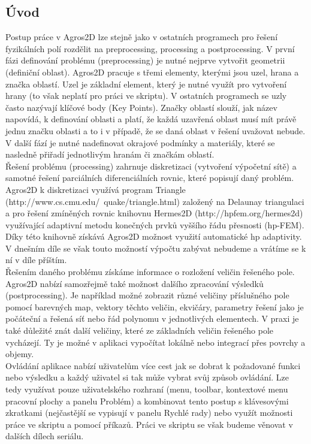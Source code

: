 \documentclass[a4paper, oneside]{article}
\begin{document}
\subsection{Úvod}
Postup práce v Agros2D lze stejně jako v ostatních programech pro řešení fyzikálních polí rozdělit na preprocessing, processing a postprocessing. V první fázi definování problému (preprocessing) je nutné nejprve vytvořit geometrii (definiční oblast). Agros2D pracuje s třemi elementy, kterými jsou uzel, hrana a značka oblastí. Uzel je základní element, který je nutné využít pro vytvoření hrany (to však neplatí pro práci ve skriptu). V ostatních programech se uzly často nazývají klíčové body (Key Points). Značky oblastí slouží, jak název napovídá, k definování oblasti a platí, že každá uzavřená oblast musí mít právě jednu značku oblasti a to i v případě, že se daná oblast v řešení uvažovat nebude. V další fází je nutné nadefinovat okrajové podmínky a materiály, které se nasledně přiřadí jednotlivým hranám či značkám oblastí.\\
Řešení problému (processing) zahrnuje diskretizaci (vytvoření výpočetní sítě) a samotné řešení parciálních diferenciálních rovnic, které popisují daný problém. Agros2D k diskretizaci využívá program Triangle (http://www.cs.cmu.edu/~quake/triangle.html) založený na Delaunay triangulaci a pro řešení zmíněných rovnic knihovnu Hermes2D (http://hpfem.org/hermes2d) využívající adaptivní metodu konečných prvků vyššího řádu přesnosti (hp-FEM). Díky této knihovně získává Agros2D možnost využití automatické hp adaptivity. V dnešním díle se však touto možností výpočtu zabývat nebudeme a vrátíme se k ní v díle příštím.\\
Řešením daného problému získáme informace o rozložení veličin řešeného pole. Agros2D nabízí samozřejmě také možnost dalšího zpracování výsledků (postprocessing). Je například možné zobrazit různé veličiny příslušného pole pomocí barevných map, vektory těchto veličin, ekvičáry, parametry řešení jako je počáteční a řešená síť nebo řád polynomu v jednotlivých elementech. V praxi je také důležité znát další veličiny, které ze základních veličin řešeného pole vycházejí. Ty je možné v aplikaci vypočítat lokálně nebo integrací přes povrchy a objemy.\\
Ovládání aplikace nabízí uživatelům více cest jak se dobrat k požadované funkci nebo výsledku a každý uživatel si tak může vybrat svůj způsob ovládání. Lze tedy využívat pouze uživatelského rozhraní (menu, toolbar, kontextové menu pracovní plochy a panelu Problém) a kombinovat tento postup s klávesovými zkratkami (nejčastější se vypisují v panelu Rychlé rady) nebo využít možnosti práce ve skriptu a pomocí příkazů. Práci ve skriptu se však budeme věnovat v dalších dílech seriálu.\\
\end{document}

